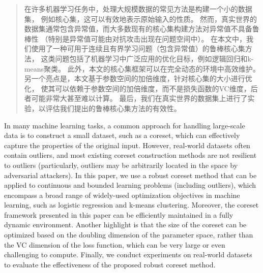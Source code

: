 

\begin{abstract}
  在许多机器学习任务中，处理大规模数据的常见方法是构建一个小的数据集，
  例如核心集，这可以有效地表示原始输入的性质。
  然而，真实世界的数据集通常包含异常值，而大多数现有的核心集构建方法对异常值不具备鲁棒性
  （特别是异常值可能由对抗攻击出现在问题空间中）。
  在本文中，我们使用了一种可用于连续且有界学习问题（包含异常值）的鲁棒核心集方法，
  这类问题包括了机器学习中广泛应用的优化目标，例如逻辑回归和k-means聚类。
  此外，本文的核心集框架可以在完全动态的环境中高效维护。
  另一个亮点是，本文基于参数空间的加倍维度，针对核心集的大小进行优化，
  使其可以依赖于参数空间的加倍维度，而不是损失函数的VC维度，后者可能非常大甚至难以计算。
  最后，我们在真实世界的数据集上进行了实验，以评估我们提出的鲁棒核心集方法的有效性。
\end{abstract}

\begin{abstract*}
  In many machine learning tasks, a common approach for handling large-scale data is to construct a small dataset, 
  such as a coreset, which can effectively capture the properties of the original input. However, 
  real-world datasets often contain outliers, and most existing coreset construction methods 
  are not resilient to outliers (particularly, outliers may be arbitrarily located in the space by adversarial 
  attackers). In this paper, we use a robust coreset method that can be applied to continuous and 
  bounded learning problems (including outliers), which encompass a broad range of widely-used optimization 
  objectives in machine learning, such as logistic regression and k-means clustering. Moreover, 
  the coreset framework presented in this paper can be efficiently maintained in a fully dynamic environment. 
  Another highlight is that the size of the coreset can be optimized based on the doubling dimension of the 
  parameter space, rather than the VC dimension of the loss function, which can be very large or even challenging 
  to compute. Finally, we conduct experiments on real-world datasets to evaluate the effectiveness of the 
  proposed robust coreset method.
\end{abstract*}
